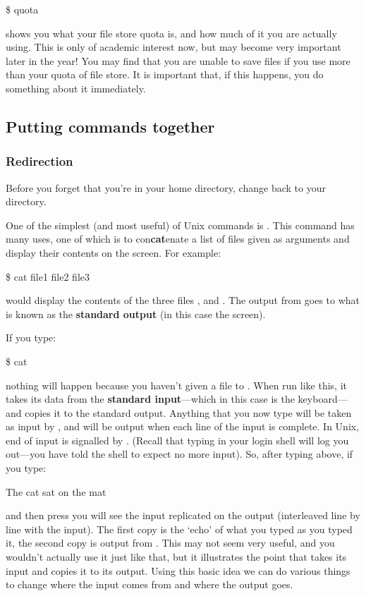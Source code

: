 \begin{ttoutenv}
\$  quota\return
\end{ttoutenv}

shows you what your file store quota is, and how much of it you are
actually using. This is only of academic interest now, but may become
very important later in the year! You may find that you are unable to
save files if you use more than your quota of
file store. It is important that, if this happens, you do something
about it immediately.

\subsection{Putting commands together}
\subsubsection{Redirection}
Before you forget that you're in your home directory, change back to
your  directory.

One of the simplest (and most useful) of Unix commands is
. This command has many uses, one of which is to
con\textbf{cat}enate a list of files given as arguments and display
their contents on the screen. For example:
\begin{ttoutenv}
\$  cat file1 file2 file3 \return
\end{ttoutenv}
would display the contents of the three files ,
 and .
The output from  goes to what is known as the
\textbf{standard output} (in this case the screen).

If you type:
\begin{ttoutenv}
\$  cat \return
\end{ttoutenv}
nothing will happen because you haven't given a file to .
When run like this, it takes its data from the \textbf{standard input}---which in this case is the keyboard---and copies it to the standard
output. Anything that you now type will be taken as input by
, and will be output when each line of the input is
complete. In Unix, end of input is signalled by .
(Recall that typing  in your login shell will log you
out---you have told the shell to expect no more input). So, after
typing  above, if you type:
\begin{ttoutenv}
The cat
sat
on the
mat
\end{ttoutenv}


and then press  you will see the input replicated on the output (interleaved line by line with the input). The first copy is the `echo' of what you typed as
you typed it, the second copy is output from . This may
not seem very useful, and you wouldn't actually use it just like that,
but it illustrates the point that  takes its input and copies it
to its output. Using this basic idea we can do various things to
change where the input comes from and where the output goes.


